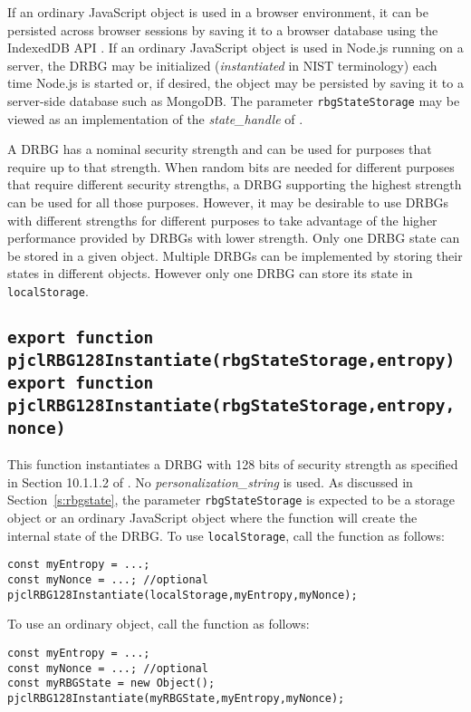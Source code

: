 \documentclass[12pt]{article}
\begin{document}
If an ordinary JavaScript object is used in a browser environment,
it can be persisted across browser sessions by saving it to a browser
database using the IndexedDB API \cite{indexeddb-api}.
If an ordinary JavaScript object is used in Node.js running on a server, 
the DRBG may be initialized ({\em instantiated\/}
in NIST terminology) each time Node.js is started or,
if desired, the object may be persisted by saving it to a server-side
database such as MongoDB.
The parameter {\tt rbgStateStorage} may be viewed as an implementation
of the {\em state\_handle\/} of \cite{SP800-90Ar1}.

A DRBG has a nominal security strength and can be used for purposes that
require up to that strength.  When random bits are needed for different 
purposes that require different security strengths, a DRBG supporting the
highest strength can be used for all those purposes.  However, it may be desirable to 
use DRBGs with different strengths for different purposes to take advantage
of the higher performance provided by DRBGs with lower strength.
Only one DRBG state can be stored in a given object.  Multiple DRBGs
can be implemented by storing their states in different objects.  However
only one DRBG can store its state in {\tt localStorage}.

\subsection{\tt export function pjclRBG128Instantiate(rbgStateStorage,entropy)\\export function pjclRBG128Instantiate(rbgStateStorage,entropy,nonce)}
\label{s:entropy}

This function instantiates a DRBG with 128 bits of security strength as specified in
Section 10.1.1.2 of \cite{SP800-90Ar1}.  No {\em personalization\_string\/} is used.
As discussed in Section~\ref{s:rbgstate}, the parameter {\tt rbgStateStorage} 
is expected to be a storage object or an ordinary JavaScript object where the 
function will create the internal state of the DRBG.
To use {\tt localStorage}, call the function as follows:
\begin{verbatim}
const myEntropy = ...;
const myNonce = ...; //optional
pjclRBG128Instantiate(localStorage,myEntropy,myNonce);
\end{verbatim}
To use an ordinary object, call the function as follows:
\begin{verbatim}
const myEntropy = ...;
const myNonce = ...; //optional
const myRBGState = new Object();
pjclRBG128Instantiate(myRBGState,myEntropy,myNonce);
\end{verbatim}
\end{document}
